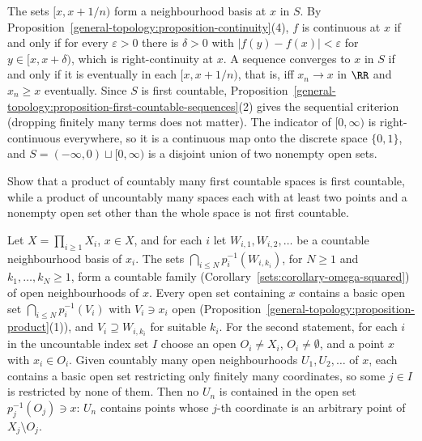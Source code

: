 \begin{solution}
The sets $[x, x + 1/n)$ form a neighbourhood basis at $x$ in $S$. By Proposition~\ref{general-topology:proposition-continuity}(4), $f$ is continuous at $x$ if and only if for every $\varepsilon > 0$ there is $\delta > 0$ with
$|f(y) - f(x)| < \varepsilon$ for $y \in [x, x + \delta)$, which is right-continuity at $x$. A sequence converges to $x$ in $S$ if and only if it is eventually in each $[x, x + 1/n)$, that is, iff $x_n \to x$ in $\RR$ and
$x_n \geq x$ eventually. Since $S$ is first countable, Proposition~\ref{general-topology:proposition-first-countable-sequences}(2) gives the sequential criterion (dropping finitely many terms does not matter). The
indicator of $[0, \infty)$ is right-continuous everywhere, so it is a continuous map onto the discrete space $\{0, 1\}$, and $S = (-\infty, 0) \sqcup [0, \infty)$ is a disjoint union of two nonempty open sets.
\end{solution}

\begin{exercise}\label{general-topology:exercise-countable-product-first-countable}
Show that a product of countably many first countable spaces is first countable, while a product of uncountably many spaces each with at least two points and a nonempty open set other than the whole space is not
first countable.
\end{exercise}

\begin{solution}
Let $X = \prod_{i \geq 1}X_i$, $x \in X$, and for each $i$ let $W_{i,1}, W_{i,2}, \ldots$ be a countable neighbourhood basis of $x_i$. The sets $\bigcap_{i \leq N}p_i^{-1}(W_{i,k_i})$, for $N \geq 1$ and $k_1, \ldots, k_N \geq 1$,
form a countable family (Corollary~\ref{sets:corollary-omega-squared}) of open neighbourhoods of $x$. Every open set containing $x$ contains a basic open set $\bigcap_{i \leq N}p_i^{-1}(V_i)$ with $V_i \ni x_i$ open
(Proposition~\ref{general-topology:proposition-product}(1)), and $V_i \supseteq W_{i,k_i}$ for suitable $k_i$. For the second statement, for each $i$ in the uncountable index set $I$ choose an open $O_i \neq X_i$, $O_i \neq \emptyset$, and a point
$x$ with $x_i \in O_i$. Given countably many open neighbourhoods $U_1, U_2, \ldots$ of $x$, each contains a basic open set restricting only finitely many coordinates, so some $j \in I$ is restricted by none of them. Then no
$U_n$ is contained in the open set $p_j^{-1}(O_j) \ni x$: $U_n$ contains points whose $j$-th coordinate is an arbitrary point of $X_j \setminus O_j$.
\end{solution}

